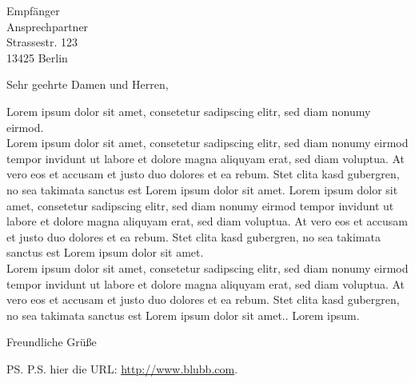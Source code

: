 \documentclass[firstfoot=false]{scrlttr2}
\begin{document}
\begin{letter}{Empfänger \\ Ansprechpartner \\ Strassestr. 123 \\ 13425 Berlin}

\opening{Sehr geehrte Damen und Herren,}

Lorem ipsum dolor sit amet, consetetur sadipscing elitr, sed diam nonumy eirmod.\\

Lorem ipsum dolor sit amet, consetetur sadipscing elitr, sed diam nonumy eirmod tempor invidunt ut labore et dolore magna aliquyam erat, sed diam voluptua. At vero eos et accusam et justo duo dolores et ea rebum. Stet clita kasd gubergren, no sea takimata sanctus est Lorem ipsum dolor sit amet. Lorem ipsum dolor sit amet, consetetur sadipscing elitr, sed diam nonumy eirmod tempor invidunt ut labore et dolore magna aliquyam erat, sed diam voluptua. At vero eos et accusam et justo duo dolores et ea rebum. Stet clita kasd gubergren, no sea takimata sanctus est Lorem ipsum dolor sit amet.\\

Lorem ipsum dolor sit amet, consetetur sadipscing elitr, sed diam nonumy eirmod tempor invidunt ut labore et dolore magna aliquyam erat, sed diam voluptua. At vero eos et accusam et justo duo dolores et ea rebum. Stet clita kasd gubergren, no sea takimata sanctus est Lorem ipsum dolor sit amet..
Lorem ipsum.

\closing{Freundliche Grüße}
\ps{P.S. hier die URL: \url{http://www.blubb.com}.}

\end{letter}
\end{document}
